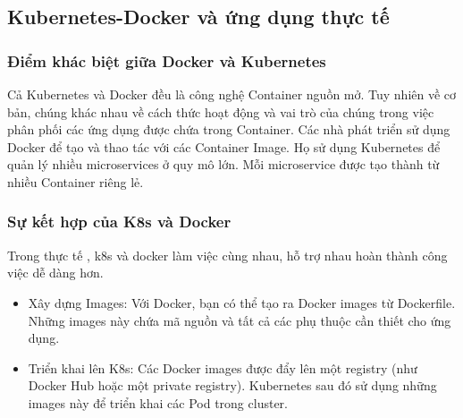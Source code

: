 \documentclass[a4paper,12pt]{article}
\begin{document}
\subsection{Kubernetes-Docker và ứng dụng thực tế }
\subsubsection{Điểm khác biệt giữa Docker và Kubernetes }
Cả Kubernetes và Docker đều là công nghệ Container nguồn mở. Tuy nhiên về cơ bản, chúng khác nhau về cách
thức hoạt động và vai trò của chúng trong việc phân phối các ứng dụng được chứa trong Container. Các nhà phát
triển sử dụng Docker để tạo và thao tác với các Container Image. Họ sử dụng Kubernetes để quản lý nhiều microservices ở quy mô lớn. Mỗi microservice được tạo thành từ nhiều Container riêng lẻ.
\subsubsection{Sự kết hợp của K8s và Docker}
Trong thực tế  , k8s và docker làm việc cùng nhau, hỗ trợ nhau hoàn thành công việc dễ dàng hơn.
\begin{itemize}
    \item Xây dựng Images: Với Docker, bạn có thể tạo ra Docker images từ Dockerfile. Những images này chứa mã nguồn và tất cả các phụ thuộc cần thiết cho ứng dụng.
    \item Triển khai lên K8s: Các Docker images được đẩy lên một registry (như Docker Hub hoặc một private registry). Kubernetes sau đó sử dụng những images này để triển khai các Pod trong cluster.
\end{itemize}
\end{document}
